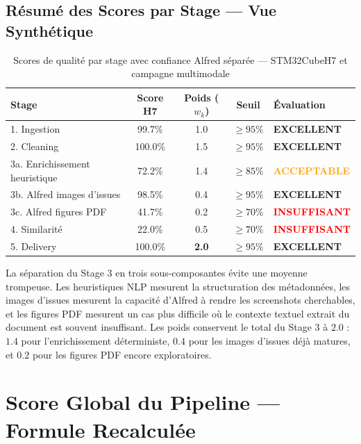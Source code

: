 \documentclass[12pt,a4paper]{report}
\begin{document}
\subsection{Résumé des Scores par Stage --- Vue Synthétique}

\begin{table}[H]
\centering
\begin{tabular}{lcccl}
\toprule
\textbf{Stage} & \textbf{Score H7} & \textbf{Poids ($w_k$)} & \textbf{Seuil} & \textbf{Évaluation} \\
\midrule
1. Ingestion & 99.7\% & 1.0 & $\geq 95\%$ & \textcolor{green!60!black}{\textbf{EXCELLENT}} \\
2. Cleaning & 100.0\% & 1.5 & $\geq 95\%$ & \textcolor{green!60!black}{\textbf{EXCELLENT}} \\
3a. Enrichissement heuristique & 72.2\% & 1.4 & $\geq 85\%$ & \textcolor{orange}{\textbf{ACCEPTABLE}} \\
3b. Alfred images d'issues & 98.5\% & 0.4 & $\geq 95\%$ & \textcolor{green!60!black}{\textbf{EXCELLENT}} \\
3c. Alfred figures PDF & 41.7\% & 0.2 & $\geq 70\%$ & \textcolor{red}{\textbf{INSUFFISANT}} \\
4. Similarité & 22.0\% & 0.5 & $\geq 70\%$ & \textcolor{red}{\textbf{INSUFFISANT}} \\
5. Delivery & 100.0\% & \textbf{2.0} & $\geq 95\%$ & \textcolor{green!60!black}{\textbf{EXCELLENT}} \\
\bottomrule
\end{tabular}
\caption{Scores de qualité par stage avec confiance Alfred séparée --- STM32CubeH7 et campagne multimodale}
\label{tab:eval_scores_h7_v2}
\end{table}

La séparation du Stage 3 en trois sous-composantes évite une moyenne trompeuse. Les heuristiques NLP mesurent la structuration des métadonnées, les images d'issues mesurent la capacité d'Alfred à rendre les screenshots cherchables, et les figures PDF mesurent un cas plus difficile où le contexte textuel extrait du document est souvent insuffisant. Les poids conservent le total du Stage 3 à $2.0$ : $1.4$ pour l'enrichissement déterministe, $0.4$ pour les images d'issues déjà matures, et $0.2$ pour les figures PDF encore exploratoires.

\section{Score Global du Pipeline --- Formule Recalculée}
\label{sec:score_global}
\end{document}
